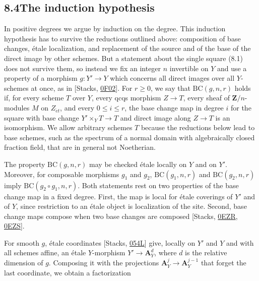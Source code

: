 \documentclass[11pt]{article}
\begin{document}
\subsection*{\texorpdfstring{8.4\quad The induction hypothesis}{8.4 The induction hypothesis}}
\label{bp13}%
\label{bp14}%
In positive degrees we argue by induction on the degree. This induction hypothesis has to survive the reductions outlined above: composition of base changes, étale localization, and replacement of the source and of the base of the direct image by other schemes. But a statement about the single square (8.1) does not survive them, so instead we fix an integer \(n\) invertible on \(Y\) and use a property of a morphism \(g:Y'\to Y\) which concerns all direct images over all \(Y\)-schemes at once, as in [Stacks, \href{https://stacks.math.columbia.edu/tag/0F02}{0F02}]. For \(r\geq0\), we say that \(\mathrm{BC}(g,n,r)\) holds if, for every scheme \(T\) over \(Y\), every qcqs morphism \(Z\to T\), every sheaf of \(\mathbf Z/n\)-modules \(M\) on \(Z_{\acute{e}t}\), and every \(0\leq i\leq r\), the base change map in degree \(i\) for the square with base change \(Y'\times_YT\to T\) and direct image along \(Z\to T\) is an isomorphism. We allow arbitrary schemes \(T\) because the reductions below lead to base schemes, such as the spectrum of a normal domain with algebraically closed fraction field, that are in general not Noetherian.

The property \(\mathrm{BC}(g,n,r)\) may be checked étale locally on \(Y\) and on \(Y'\). Moreover, for composable morphisms \(g_1\) and \(g_2\), \(\mathrm{BC}(g_1,n,r)\) and \(\mathrm{BC}(g_2,n,r)\) imply \(\mathrm{BC}(g_2\circ g_1,n,r)\). Both statements rest on two properties of the base change map in a fixed degree. First, the map is local for étale coverings of \(Y'\) and of \(Y\), since restriction to an étale object is localization of the site. Second, base change maps compose when two base changes are composed [Stacks, \href{https://stacks.math.columbia.edu/tag/0EZR}{0EZR}, \href{https://stacks.math.columbia.edu/tag/0EZS}{0EZS}].

For smooth \(g\), étale coordinates [Stacks, \href{https://stacks.math.columbia.edu/tag/054L}{054L}] give, locally on \(Y'\) and \(Y\) and with all schemes affine, an étale \(Y\)-morphism \(Y'\to\mathbf A^d_Y\), where \(d\) is the relative dimension of \(g\). Composing it with the projections \(\mathbf A^{j}_Y\to\mathbf A^{j-1}_Y\) that forget the last coordinate, we obtain a factorization
\end{document}
